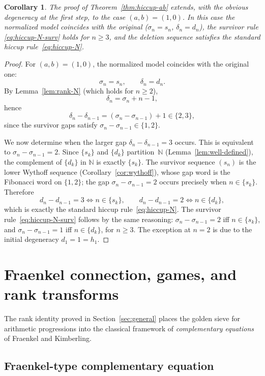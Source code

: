 \documentclass[11pt]{article}
\numberwithin{equation}{section}
\theoremstyle{plain}
\newtheorem{corollary}[theorem]{Corollary}
\theoremstyle{definition}
\theoremstyle{remark}
\newcommand{\N}{\mathbb{N}}
\begin{document}
\begin{corollary}
\label{cor:hiccup-N}
The proof of Theorem~\ref{thm:hiccup-ab} extends, with the obvious
degeneracy at the first step, to the case $(a,b)=(1,0)$.
In this case the normalized model coincides with the original
($\sigma_n=s_n$, $\delta_n=d_n$), the survivor rule
\eqref{eq:hiccup-N-surv} holds for $n\ge3$, and the deletion sequence
satisfies the standard hiccup rule~\eqref{eq:hiccup-N}.
\end{corollary}

\begin{proof}
For $(a,b)=(1,0)$, the normalized model coincides with the original one:
\[
  \sigma_n=s_n,\qquad \delta_n=d_n.
\]
By Lemma~\ref{lem:rank-N} (which holds for $n\ge2$),
\[
  \delta_n=\sigma_n+n-1,
\]
hence
\[
  \delta_n-\delta_{n-1}=(\sigma_n-\sigma_{n-1})+1\in\{2,3\},
\]
since the survivor gaps satisfy $\sigma_n-\sigma_{n-1}\in\{1,2\}$.

We now determine when the larger gap $\delta_n-\delta_{n-1}=3$ occurs.
This is equivalent to $\sigma_n-\sigma_{n-1}=2$.  Since $\{s_k\}$ and $\{d_k\}$
partition~$\N$ (Lemma~\ref{lem:well-defined}), the complement of $\{d_k\}$ in $\N$
is exactly $\{s_k\}$.  The survivor sequence $(s_n)$ is the lower Wythoff sequence
(Corollary~\ref{cor:wythoff}), whose gap word is the Fibonacci word on $\{1,2\}$;
the gap $\sigma_n-\sigma_{n-1}=2$ occurs precisely when $n\in\{s_k\}$.
Therefore
\[
  d_n-d_{n-1}=3 \iff n\in\{s_k\},
  \qquad
  d_n-d_{n-1}=2 \iff n\in\{d_k\},
\]
which is exactly the standard hiccup rule~\eqref{eq:hiccup-N}.
The survivor rule~\eqref{eq:hiccup-N-surv} follows by the same reasoning:
$\sigma_n-\sigma_{n-1}=2$ iff $n\in\{s_k\}$, and $\sigma_n-\sigma_{n-1}=1$
iff $n\in\{d_k\}$, for $n\ge3$.
The exception at $n=2$ is due to the initial degeneracy $d_1=1=h_1$.
\end{proof}


\section{Fraenkel connection, games, and rank transforms}\label{sec:fraenkel}

The rank identity proved in Section~\ref{sec:general} places the golden sieve
for arithmetic progressions into the classical framework of
\emph{complementary equations} of Fraenkel
and Kimberling.

\subsection{Fraenkel-type complementary equation}
\end{document}
